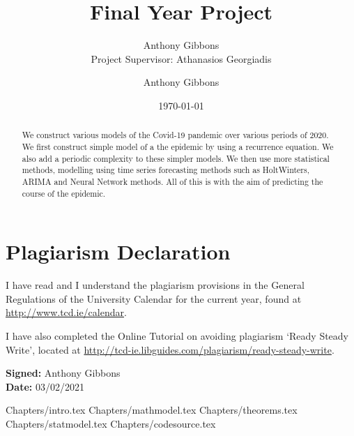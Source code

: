 \documentclass[a4paper]{article}
\title{Final Year Project}
\author{Anthony Gibbons \qquad 17322353 \\ Project Supervisor: Athanasios Georgiadis}
\author{Anthony Gibbons}
\date{\today}
\begin{document}
\maketitle      

\begin{abstract}
    We construct various models of the Covid-19 pandemic over various periods of 2020. We first construct simple model of a the epidemic by using a recurrence equation. We also add a periodic complexity to these simpler models. We then use more statistical methods, modelling using time series forecasting methods such as HoltWinters, ARIMA and Neural Network methods. All of this is with the aim of predicting the course of the epidemic.
\end{abstract}
\pagebreak
\section*{Plagiarism Declaration}
I have read and I understand the plagiarism provisions in the General
Regulations of the University Calendar for the current year, found at
\url{http://www.tcd.ie/calendar}.

I have also completed the Online Tutorial on avoiding plagiarism
‘Ready Steady Write’, located at
\url{http://tcd-ie.libguides.com/plagiarism/ready-steady-write}.

\textbf{Signed:} Anthony Gibbons \\
\textbf{Date:} 03/02/2021
\pagebreak

\hypersetup{
    linkcolor=black,
}

\tableofcontents \pagebreak

\listoffigures \pagebreak

{Chapters/intro.tex}
\pagebreak
{Chapters/mathmodel.tex}
\pagebreak
{Chapters/theorems.tex}
\pagebreak
{Chapters/statmodel.tex}
\pagebreak
{Chapters/codesource.tex}
\pagebreak 
\printbibliography
\end{document}
